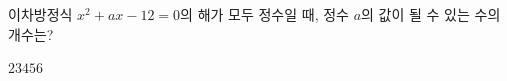 이차방정식 $x^2+ax-12=0$의 해가 모두 정수일 때, 정수 $a$의 값이 될 수 있는 수의 개수는?
\begin{choices32}{$2$}{$3$}{$4$}{$5$}{$6$}\end{choices32}
